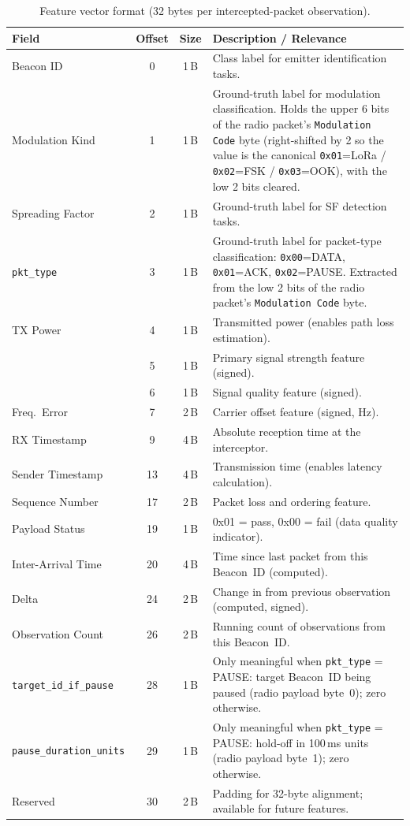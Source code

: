 \documentclass[11pt,letterpaper]{article}
\begin{document}
	\begin{table}[ht!]
		\centering
		\caption{Feature vector format (32 bytes per intercepted-packet observation).}
		\label{tab:feature_vector}
		\renewcommand{\arraystretch}{1.3}
		\begin{tabularx}{\textwidth}{l c c X}
			\toprule
			\textbf{Field} & \textbf{Offset} & \textbf{Size} & \textbf{Description / \ML{} Relevance} \\
			\midrule
			Beacon ID & 0 & 1\,B & Class label for emitter identification tasks. \\
			Modulation Kind & 1 & 1\,B & Ground-truth label for modulation classification. Holds the upper 6 bits of the radio packet's \texttt{Modulation Code} byte (right-shifted by 2 so the value is the canonical \texttt{0x01}=LoRa / \texttt{0x02}=FSK / \texttt{0x03}=OOK), with the low 2 bits cleared. \\
			Spreading Factor & 2 & 1\,B & Ground-truth label for SF detection tasks. \\
			\texttt{pkt\_type} & 3 & 1\,B & Ground-truth label for packet-type classification: \texttt{0x00}=DATA, \texttt{0x01}=ACK, \texttt{0x02}=PAUSE. Extracted from the low 2 bits of the radio packet's \texttt{Modulation Code} byte. \\
			TX Power & 4 & 1\,B & Transmitted power (enables path loss estimation). \\
			\RSSI{} & 5 & 1\,B & Primary signal strength feature (signed). \\
			\SNR{} & 6 & 1\,B & Signal quality feature (signed). \\
			Freq.\ Error & 7 & 2\,B & Carrier offset feature (signed, Hz). \\
			RX Timestamp & 9 & 4\,B & Absolute reception time at the interceptor. \\
			Sender Timestamp & 13 & 4\,B & Transmission time (enables latency calculation). \\
			Sequence Number & 17 & 2\,B & Packet loss and ordering feature. \\
			Payload \CRC{} Status & 19 & 1\,B & 0x01 = pass, 0x00 = fail (data quality indicator). \\
			Inter-Arrival Time & 20 & 4\,B & Time since last packet from this Beacon~ID (computed). \\
			\RSSI{} Delta & 24 & 2\,B & Change in \RSSI{} from previous observation (computed, signed). \\
			Observation Count & 26 & 2\,B & Running count of observations from this Beacon~ID. \\
			\texttt{target\_id\_if\_pause} & 28 & 1\,B & Only meaningful when \texttt{pkt\_type} = PAUSE: target Beacon~ID being paused (radio payload byte~0); zero otherwise. \\
			\texttt{pause\_duration\_units} & 29 & 1\,B & Only meaningful when \texttt{pkt\_type} = PAUSE: hold-off in 100\,ms units (radio payload byte~1); zero otherwise. \\
			Reserved & 30 & 2\,B & Padding for 32-byte alignment; available for future features. \\
			\bottomrule
		\end{tabularx}
	\end{table}
\end{document}
